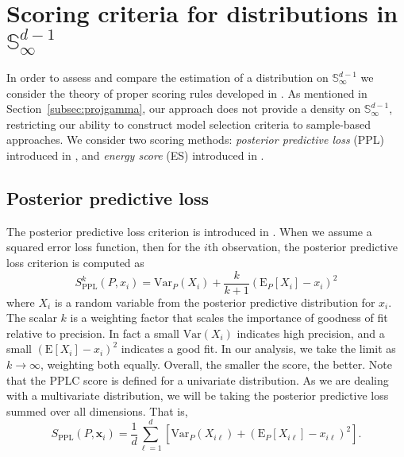 \section{Scoring criteria for distributions in ${\mathbb S}_\infty^{d-1}$\label{sec:evaluation}}

In order to assess and compare the estimation of a distribution on ${\mathbb S}_\infty^{d-1}$ we consider the theory of proper scoring rules developed in \cite{gneiting2007}.
As mentioned in Section~\ref{subsec:projgamma}, our approach does not provide a density on ${\mathbb S}_{\infty}^{d-1}$, restricting our ability to construct model selection criteria to sample-based approaches.  We consider two scoring methods:  \emph{posterior predictive loss} (PPL) introduced in \cite{gelfand1998}, and \emph{energy score} (ES) introduced in \cite{gneiting2007}.

\subsection{Posterior predictive loss}
The posterior predictive loss criterion is introduced in \cite{gelfand1998}.  When we
  assume a squared error loss function, then for the $i$th observation, the posterior predictive
  loss criterion is computed as
  \begin{equation}
    \label{eq:ppl}
      S_{\text{PPL}}^k\left(P,x_i\right) = \text{Var}_P\left(X_i\right) + \frac{k}{k+1}\left(\text{E}_P\left[X_{i}\right] - x_i\right)^2
  \end{equation}
  where $X_i$ is a random variable from the posterior predictive distribution for $x_i$.  The
  scalar $k$ is a weighting factor that scales the importance of goodness of fit
  relative to precision.  In fact a small $\text{Var}(X_{i})$ indicates high
  precision, and a small $(\text{E}[X_{i}] - x_{i})^2$  indicates a good fit.  In our analysis, we take the limit as $k\to\infty$, weighting both
  equally. Overall, the smaller the score, the better.  Note that the PPLC score is defined for a univariate distribution.  As we are dealing
  with a multivariate distribution, we will be taking the posterior predictive loss
  summed over all dimensions.  That is,
  \begin{equation}
    \label{eq:ppl2}
      S_{\text{PPL}}\left(P,\bm{x}_i\right) = \frac{1}{d}\sum_{\ell = 1}^d\left[\text{Var}_P\left(X_{i\ell}\right) + \left(\text{E}_P\left[X_{i\ell}\right] - x_{i\ell}\right)^2\right] .
  \end{equation}

